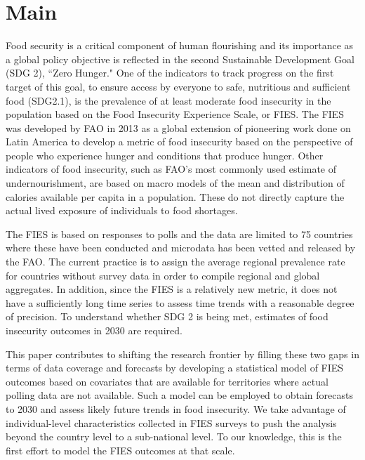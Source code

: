 \documentclass{article}
\begin{document}
\section{Main}
Food security is a critical component of human flourishing and its importance as a global policy objective is reflected in the second Sustainable Development Goal (SDG 2), ``Zero Hunger." One of the indicators to track progress on the first target of this goal, to ensure access by everyone to safe, nutritious and sufficient food (SDG2.1), is the prevalence of at least moderate food insecurity in the population based on the Food Insecurity Experience Scale, or FIES. The FIES was developed by FAO in 2013 as a global extension of pioneering work done on Latin America to develop a metric of food insecurity based on the perspective of people who experience hunger and conditions that produce hunger. Other indicators of food insecurity, such as FAO's most commonly used estimate of undernourishment, are based on macro models of the mean and distribution of calories available per capita in a population. These do not directly capture the actual lived exposure of individuals to food shortages. 

The FIES is based on responses to polls and the data are limited to 75 countries where these have been conducted and microdata has been vetted and released by the FAO. The current practice is to assign the average regional prevalence rate for countries without survey data in order to compile regional and global aggregates. In addition, since the FIES is a relatively new metric, it does not have a sufficiently long time series to assess time trends with a reasonable degree of precision. To understand whether SDG 2 is being met, estimates of food insecurity outcomes in 2030 are required.

This paper contributes to shifting the research frontier by filling these two gaps in terms of data coverage and forecasts by developing a statistical model of FIES outcomes based on covariates that are available for territories where actual polling data are not available. Such a model can be employed to obtain forecasts to 2030 and assess likely future trends in food insecurity. We take advantage of individual-level characteristics collected in FIES surveys to push the analysis beyond the country level to a sub-national level. To our knowledge, this is the first effort to model the FIES outcomes at that scale.
\end{document}
